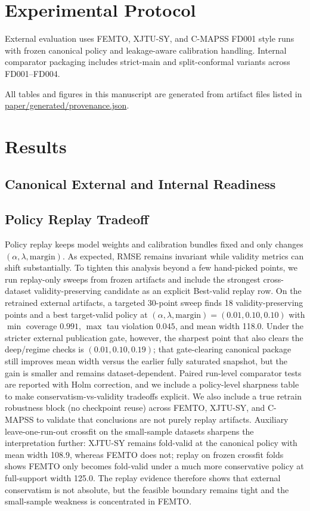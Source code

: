 \documentclass[11pt]{article}
\begin{document}
\section{Experimental Protocol}
External evaluation uses FEMTO, XJTU-SY, and C-MAPSS FD001 style runs with frozen canonical policy and leakage-aware calibration handling. Internal comparator packaging includes strict-main and split-conformal variants across FD001--FD004.

All tables and figures in this manuscript are generated from artifact files listed in \url{paper/generated/provenance.json}.

\section{Results}
\subsection{Canonical External and Internal Readiness}


\subsection{Policy Replay Tradeoff}
Policy replay keeps model weights and calibration bundles fixed and only changes $(\alpha,\lambda,\text{margin})$. As expected, RMSE remains invariant while validity metrics can shift substantially. To tighten this analysis beyond a few hand-picked points, we run replay-only sweeps from frozen artifacts and include the strongest cross-dataset validity-preserving candidate as an explicit Best-valid replay row. On the retrained external artifacts, a targeted 30-point sweep finds 18 validity-preserving points and a best target-valid policy at $(\alpha,\lambda,\text{margin})=(0.01,0.10,0.10)$ with $\min$ coverage $0.991$, $\max$ tau violation $0.045$, and mean width \num{118.0}. Under the stricter external publication gate, however, the sharpest point that also clears the deep/regime checks is $(0.01,0.10,0.19)$; that gate-clearing canonical package still improves mean width versus the earlier fully saturated snapshot, but the gain is smaller and remains dataset-dependent. Paired run-level comparator tests are reported with Holm correction, and we include a policy-level sharpness table to make conservatism-vs-validity tradeoffs explicit. We also include a true retrain robustness block (no checkpoint reuse) across FEMTO, XJTU-SY, and C-MAPSS to validate that conclusions are not purely replay artifacts. Auxiliary leave-one-run-out crossfit on the small-sample datasets sharpens the interpretation further: XJTU-SY remains fold-valid at the canonical policy with mean width \num{108.9}, whereas FEMTO does not; replay on frozen crossfit folds shows FEMTO only becomes fold-valid under a much more conservative policy at full-support width \num{125.0}. The replay evidence therefore shows that external conservatism is not absolute, but the feasible boundary remains tight and the small-sample weakness is concentrated in FEMTO.
\end{document}
